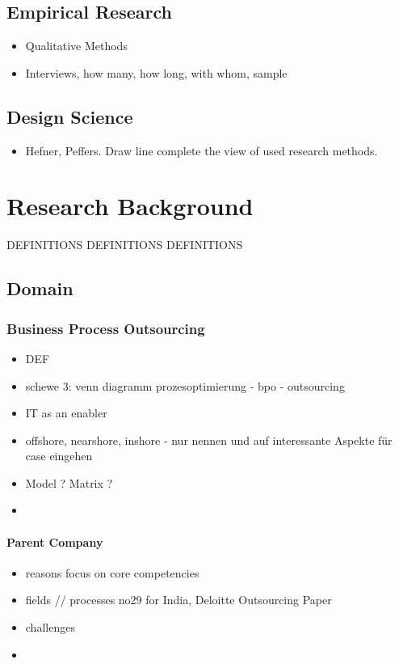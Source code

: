 	\section{Empirical Research}
		\begin{itemize}
			\item Qualitative Methods
			\item Interviews, how many, how long, with whom, sample
			
		\end{itemize}
	\section{Design Science}
		\begin{itemize}
			\item Hefner, Peffers. Draw line complete the view of used research methods.
		\end{itemize}
\chapter{Research Background}
	DEFINITIONS DEFINITIONS DEFINITIONS
	\section{Domain}
		\subsection{Business Process Outsourcing}
		\begin{itemize}
			\item DEF
			\item schewe 3: venn diagramm prozesoptimierung - bpo - outsourcing
			\item IT as an enabler
			\item offshore, nearshore, inshore - nur nennen und auf interessante Aspekte für case eingehen
			\item Model ? Matrix ? 
			\item 
		\end{itemize}
		\subsubsection{Parent Company}
		\begin{itemize}
			\item reasons focus on core competencies
			\item fields // processes no29 for India, Deloitte Outsourcing Paper
			\item challenges
			\item 
		\end{itemize}
